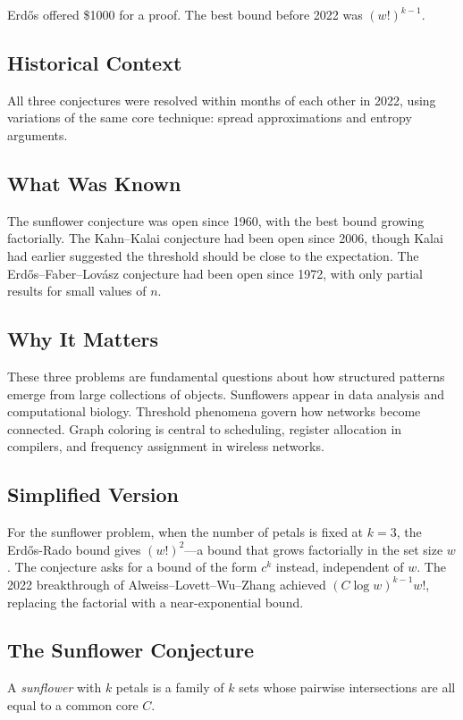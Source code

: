 Erd\H{o}s offered \$1000 for a proof. The best bound before 2022 was $(w!)^{k-1}$.

\subsection{Historical Context}
All three conjectures were resolved within months of each other in 2022, using variations of the same core technique: spread approximations and entropy arguments.

\subsection{What Was Known}
The sunflower conjecture was open since 1960, with the best bound growing factorially. The Kahn--Kalai conjecture had been open since 2006, though Kalai had earlier suggested the threshold should be close to the expectation. The Erd\H{o}s--Faber--Lov\'{a}sz conjecture had been open since 1972, with only partial results for small values of $n$.

\subsection{Why It Matters}
These three problems are fundamental questions about how structured patterns emerge from large collections of objects. Sunflowers appear in data analysis and computational biology. Threshold phenomena govern how networks become connected. Graph coloring is central to scheduling, register allocation in compilers, and frequency assignment in wireless networks.

\subsection{Simplified Version}
For the sunflower problem, when the number of petals is fixed at $k = 3$, the Erd\H{o}s-Rado bound gives $(w!)^2$---a bound that grows factorially in the set size $w$. The conjecture asks for a bound of the form $c^k$ instead, independent of $w$. The 2022 breakthrough of Alweiss--Lovett--Wu--Zhang achieved $(C \log w)^{k-1} w!$, replacing the factorial with a near-exponential bound.

\subsection{The Sunflower Conjecture}
A \emph{sunflower} with $k$ petals is a family of $k$ sets whose pairwise intersections are all equal to a common core $C$.

